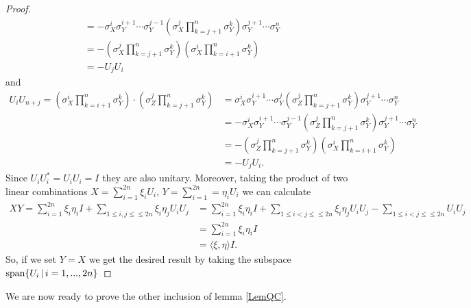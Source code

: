 \begin{proof}
\begin{align*}
		&= - \sigma_X^i \sigma_Y^{i+1} \cdots \sigma_Y^{j-1} ( \sigma_X^j \prod_{k = j+1}^{n}\sigma_Y^k) \sigma_Y^{j+1} \cdots \sigma_Y^n  \\
		&= - ( \sigma_X^j \prod_{k = j+1}^{n}\sigma_Y^k)(\sigma_X^i \prod_{k = i+1}^{n}\sigma_Y^k)  \\
		&= -U_jU_i
		\end{align*}
		and 
		\begin{align*}
		U_iU_{n+j} =  (\sigma_X^i \prod_{k = i+1}^{n}\sigma_Y^k) \cdot( \sigma_Z^j \prod_{k = j+1}^{n}\sigma_Y^k) &=
		\sigma_X^i \sigma_Y^{i+1} \cdots \sigma_Y^j ( \sigma_Z^j \prod_{k = j+1}^{n}\sigma_Y^k) \sigma_Y^{j+1} \cdots \sigma_Y^n \\
		&= - \sigma_X^i \sigma_Y^{i+1} \cdots \sigma_Y^{j-1} ( \sigma_Z^j \prod_{k = j+1}^{n}\sigma_Y^k) \sigma_Y^{j+1} \cdots \sigma_Y^n  \\
		&= - ( \sigma_Z^j \prod_{k = j+1}^{n}\sigma_Y^k)(\sigma_X^i \prod_{k = i+1}^{n}\sigma_Y^k)  \\
		&= -U_jU_i.
		\end{align*}
		Since $ U_iU_i^* = U_iU_i =  I$ they are also unitary. 
		Moreover, taking the product of two linear combinations $ X = \sum_{i = 1}^{2n}\xi_i U_i$, $ Y = \sum_{i = 1}^{2n} = \eta_iU_i $ we can calculate 
		\begin{align*}
		XY = \sum_{i = 1}^{2n} \xi_i \eta_i I + \sum_{1 \le i,j \le \le 2n}\xi_i\eta_j U_i U_j &= \sum_{i = 1}^{2n} \xi_i \eta_i I + \sum_{1 \le i < j \le \le 2n}\xi_i\eta_jU_iU_j - \sum_{1 \le i < j \le \le 2n}U_iU_j \\
		&=\sum_{i = 1}^{2n} \xi_i \eta_i I \\
		&= \langle \xi, \eta \rangle I.
		\end{align*}
		So, if we set $ Y = X $ we get the desired result by taking the subspace $ \textup{span} \{ U_i \, | \, i = 1,...,2n \} $
		
	\end{proof}

We are now ready to prove the other inclusion of lemma \ref{LemQC}.

